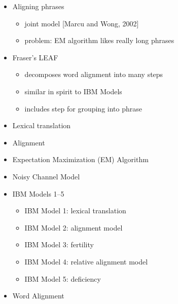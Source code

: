 \documentclass[landscape]{slides}
\begin{document}
\vspace{10mm}
\begin{itemize}
\item Aligning phrases
\begin{itemize}
\item joint model [Marcu and Wong, 2002]
\item problem: EM algorithm likes really long phrases
\end{itemize}
\vspace{10mm}
\item Fraser's LEAF
\begin{itemize}
\item decomposes word alignment into many steps
\item similar in spirit to IBM Models
\item includes step for grouping into phrase
\end{itemize}
\end{itemize}



\begin{itemize} \itemsep -1mm
\item Lexical translation
\item Alignment
\item Expectation Maximization (EM) Algorithm
\item Noisy Channel Model
\item IBM Models 1--5
\begin{itemize}
\item IBM Model 1: lexical translation
\item IBM Model 2: alignment model
\item IBM Model 3: fertility
\item IBM Model 4: relative alignment model
\item IBM Model 5: deficiency
\end{itemize}
\item Word Alignment
\end{itemize}
\end{document}
